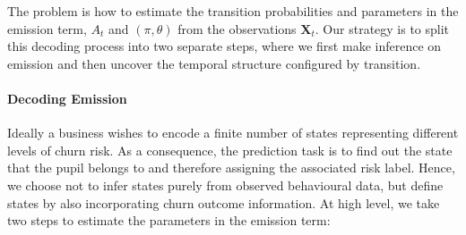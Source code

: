 The problem is how to estimate the transition probabilities and parameters in the emission term, $A_t$ and $(\pi, \theta)$ from the observations $\mathbf{X}_t$. Our strategy is to split this decoding process into two separate steps, where we first make inference on emission and then uncover the temporal structure configured by transition.

\paragraph*{Decoding Emission}

Ideally a business wishes to encode a finite number of states representing different levels of churn risk. As a consequence, the prediction task is to find out the state that the pupil belongs to and therefore assigning the associated risk label. Hence, we choose not to infer states purely from observed behavioural data, but define states by also incorporating churn outcome information. At high level, we take two steps to estimate the parameters in the emission term:
